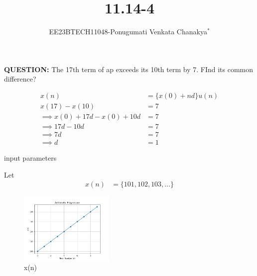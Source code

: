 \documentclass[journal,12pt,twocolumn]{IEEEtran}
\theoremstyle{remark}
\begin{document}
 
 \vspace{3cm}
 \title{\textbf{11.14-4}}
 \author{EE23BTECH11048-Ponugumati Venkata Chanakya$^{*}$%
 }
 \maketitle
 \newpage
 \bigskip
 \renewcommand{\thefigure}{\theenumi}
 \renewcommand{\thetable}{\theenumi}
 \textbf{QUESTION:}
 The 17th term of ap exceeds its 10th term by 7. FInd its common difference?\\
 \solution

 \begin{align}
     x(n) &= \{x(0)+nd\}u(n) \\
     x(17)-x(10) &= 7\\
    \implies {x(0)+17d}-{x(0)+10d} &= 7\\
    \implies 17d-10d &= 7\\
    \implies 7d &= 7\\
    \implies d &= 1
 \end{align}

 
 \begin{table}[!ht]
    \centering
        
    \caption{input parameters}
    \label{tab:10_5_3_12}
\end{table}
Let \\
\begin{align}
x(n)&= \lbrace 101,102,103,...\rbrace 
\end{align}
\begin{figure}[h!]
    \centering
    \includegraphics[width=0.4\textwidth]{figs/fig1.png}
    \caption{x(n)}
\end{figure}
 
 
\end{document}
